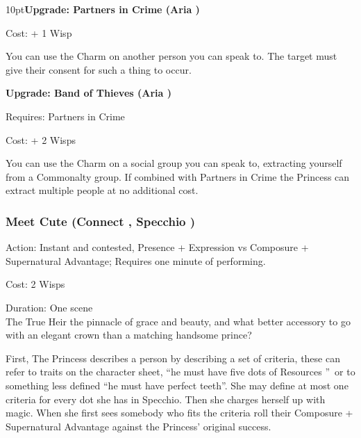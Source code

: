 \begin{myindentpar}{10pt}\textbf{Upgrade: Partners in Crime (Aria \textbullet\textbullet\textbullet\textbullet)}

\noindent Cost: + 1 Wisp

You can use the Charm on another person you can speak to. The target must give their consent for such a thing to occur.

\textbf{Upgrade: Band of Thieves (Aria \textbullet\textbullet\textbullet\textbullet\textbullet)}

\noindent Requires: Partners in Crime

\noindent Cost: + 2 Wisps

You can use the Charm on a social group you can speak to, extracting yourself from a Commonalty group. If combined with Partners in Crime the Princess can extract multiple people at no additional cost.\end{myindentpar}

\subsubsection*{Meet Cute (Connect \textbullet\textbullet, Specchio \textbullet\textbullet\textbullet)}

\noindent Action: Instant and contested, Presence + Expression vs Composure + Supernatural Advantage; Requires one minute of performing.

\noindent Cost: 2 Wisps 

\noindent Duration: One scene\\

\noindent The True Heir the pinnacle of grace and beauty, and what better accessory to go with an elegant crown than a matching handsome prince? 

First, The Princess describes a person by describing a set of criteria, these can refer to traits on the character sheet, \textquotedblleft he must have five dots of Resources \textquotedblright\, or to something less defined \textquotedblleft he must have perfect teeth\textquotedblright. She may define at most one criteria for every dot she has in Specchio. Then she charges herself up with magic. When she first sees somebody who fits the criteria roll their Composure + Supernatural Advantage against the Princess' original success.

